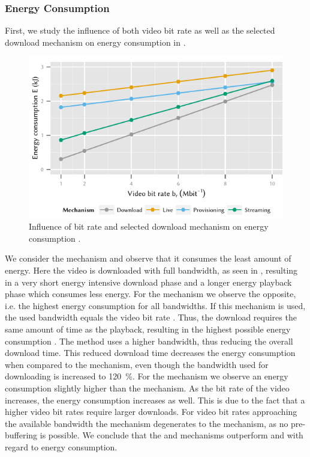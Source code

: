 \subsubsection*{Energy Consumption}\label{sec:application:lte_video:numerical_evaluation:energy_consumption}
First, we study the influence of both video bit rate \bitrate as well as the selected download mechanism on energy consumption in .
\begin{figure}
  \centering
  \includegraphics{application/lte_video/numerical_evaluation/figures/bitrate2energy}
  \caption{Influence of bit rate \bitrate and selected download mechanism on energy consumption \energyconsumption.}
  \label{fig:application:lte_video:numerical_evaluation:energy_consumption:bitrate2energy}
\end{figure}

We consider the \download mechanism and observe that it consumes the least amount of energy.
Here the video is downloaded with full bandwidth, as seen in , resulting in a very short energy intensive download phase and a longer energy playback phase which consumes less energy.
For the \live mechanism we observe the opposite, i.e. the highest energy consumption for all bandwidths.
If this mechanism is used, the used bandwidth equals the video bit rate \bitrate.
Thus, the download requires the same amount of time as the playback, resulting in the highest possible energy consumption \energyconsumption.
The \serviceprovisioning method uses a higher bandwidth, thus reducing the overall download time.
This reduced download time decreases the energy consumption \energyconsumption when compared to the \live mechanism, even though the bandwidth used for downloading is increased to \SI{120}{\percent}.
For the \streaming mechanism we observe an energy consumption \energyconsumption slightly higher than the \download mechanism.
As the bit rate \bitrate of the video increases, the energy consumption \energyconsumption increases as well.
This is due to the fact that a higher video bit rates \bitrate require larger downloads.
For video bit rates \bitrate approaching the available bandwidth the \streaming mechanism degenerates to the \live mechanism, as no pre-buffering is possible.
We conclude that the \download and \streaming mechanisms outperform \live and \serviceprovisioning with regard to energy consumption.


